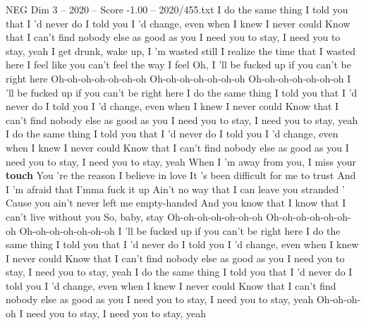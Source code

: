 \begin{textsample}{NEG Dim 3 – 2020 – Score -1.00 – 2020/455.txt}  \label{ex:f3_neg_037}
I do the same thing I told you that I 'd never do I told you I 'd change, even when I knew I never could Know that I can't find nobody else as good as you I need you to stay, I need you to stay, yeah I get drunk, wake up, I 'm wasted still I realize the time that I wasted here I feel like you can't feel the way I feel Oh, I 'll be fucked up if you can't be right here Oh-oh-oh-oh-oh-oh-oh Oh-oh-oh-oh-oh-oh-oh Oh-oh-oh-oh-oh-oh-oh I 'll be fucked up if you can't be right here I do the same thing I told you that I 'd never do I told you I 'd change, even when I knew I never could Know that I can't find nobody else as good as you I need you to stay, I need you to stay, yeah I do the same thing I told you that I 'd never do I told you I 'd change, even when I knew I never could Know that I can't find nobody else as good as you I need you to stay, I need you to stay, yeah When I 'm away from you, I miss your \textbf{touch} You 're the reason I believe in love It 's been difficult for me to trust And I 'm afraid that I'mma fuck it up Ain't no way that I can leave you stranded ' Cause you ain't never left me empty-handed And you know that I know that I can't live without you So, baby, stay Oh-oh-oh-oh-oh-oh-oh Oh-oh-oh-oh-oh-oh-oh Oh-oh-oh-oh-oh-oh-oh I 'll be fucked up if you can't be right here I do the same thing I told you that I 'd never do I told you I 'd change, even when I knew I never could Know that I can't find nobody else as good as you I need you to stay, I need you to stay, yeah I do the same thing I told you that I 'd never do I told you I 'd change, even when I knew I never could Know that I can't find nobody else as good as you I need you to stay, I need you to stay, yeah Oh-oh-oh-oh I need you to stay, I need you to stay, yeah

\end{textsample}
